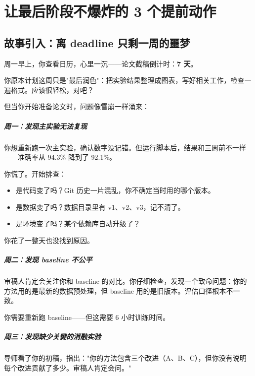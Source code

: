 \chapter{让最后阶段不爆炸的 3 个提前动作}
\label{ch:no_boom}

\section{故事引入：离 deadline 只剩一周的噩梦}

周一早上，你查看日历，心里一沉——论文截稿倒计时：\textbf{7 天}。

你原本计划这周只是"最后润色"：把实验结果整理成图表，写好相关工作，检查一遍格式。应该很轻松，对吧？

但当你开始准备论文时，问题像雪崩一样涌来：

\paragraph{周一：发现主实验无法复现}

你想重新跑一次主实验，确认数字没记错。但运行脚本后，结果和三周前不一样——准确率从 94.3\% 降到了 92.1\%。

你慌了。开始排查：
\begin{itemize}
  \item 是代码变了吗？Git 历史一片混乱，你不确定当时用的哪个版本。
  \item 是数据变了吗？数据目录里有 v1、v2、v3，记不清了。
  \item 是环境变了吗？某个依赖库自动升级了？
\end{itemize}

你花了一整天也没找到原因。

\paragraph{周二：发现 baseline 不公平}

审稿人肯定会关注你和 baseline 的对比。你仔细检查，发现一个致命问题：你的方法用的是最新的数据预处理，但 baseline 用的是旧版本。评估口径根本不一致。

你需要重新跑 baseline——但这需要 6 小时训练时间。

\paragraph{周三：发现缺少关键的消融实验}

导师看了你的初稿，指出："你的方法包含三个改进（A、B、C），但你没有说明每个改进贡献了多少。审稿人肯定会问。"

